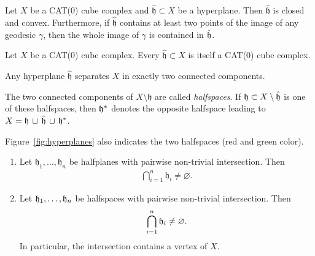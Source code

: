 \begin{prop}
  Let \(X\) be a CAT(0) cube complex and \(\mathfrak{\hat h} \subset X\) be a hyperplane. Then \(\mathfrak{\hat h}\) is closed and convex. Furthermore, if \(\mathfrak{\hat h}\) contains at least two points of the image of any geodesic \(\gamma\), then the whole image of \(\gamma\) is contained in \(\mathfrak{\hat h}\).
\end{prop}

\begin{cor}
  Let \(X\) be a CAT(0) cube complex. Every \(\mathfrak{\hat h} \subset X\) is itself a CAT(0) cube complex.
\end{cor}

\begin{thm}
  Any hyperplane \(\mathfrak{\hat h}\) separates \(X\) in exactly two connected components.
\end{thm}

\begin{defin}[Halfspaces]
  The two connected components of \(X \setminus \mathfrak{h}\) are called \emph{halfspaces}. If \(\mathfrak{h} \subset X \setminus \mathfrak{\hat h}\) is one of these halfspaces, then \(\mathfrak{h}^\ast\) denotes the opposite halfspace leading to \(X = \mathfrak{h}\, \sqcup\, \mathfrak{\hat h}\, \sqcup\, \mathfrak{h}^\ast \).
\end{defin}

\begin{bsp}
  Figure~\ref{fig:hyperplanes} also indicates the two halfspaces (red and green color).
\end{bsp}

\begin{thm}
  \label{thm:common-intersection}
  \begin{enumerate}
  \item Let \(\mathfrak{h}_1, \dots, \mathfrak{h}_n\) be halfplanes with pairwise non-trivial intersection. Then
    \begin{align*}
      \bigcap_{i=1}^n \mathfrak{h}_i \neq \varnothing.
    \end{align*}
  \item Let \(\mathfrak{h}_1, \dots, \mathfrak{h}_n\) be halfspaces with pairwise non-trivial intersection. Then
    \begin{align*}
      \bigcap_{i=1}^n \mathfrak{h}_i \neq \varnothing.
    \end{align*}
    In particular, the intersection contains a vertex of \(X\).
  \end{enumerate}
\end{thm}


